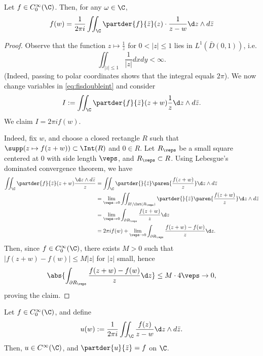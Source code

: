 \documentclass[11pt]{report}
\begin{document}
\begin{thm}[][label=thm:fisdoubleint]
    Let $f \in C_0^\infty (\C)$. Then, for any $\omega \in \C$,
    \begin{align} \label{eq:fisdoubleint}
        f(w) = \frac{1}{2\pi i }\iint_\C \partder{f}{\bar z}(z)\cdot  \frac{1}{z-w}\d z \land d \bar z
    \end{align}
\end{thm}

\begin{proof}
    Observe that the function $z \mapsto \frac{1}{z}$ for $0 < |z| \leq 1$ lies in $L^1(\bar D(0,1))$, i.e.
    $$\iint_{|z|\leq 1}\frac{1}{|z|}dxdy < \infty.$$
    (Indeed, passing to polar coordinates shows that the integral equals $2\pi$). We now change variables in \eqref{eq:fisdoubleint} and consider
    $$I:= \iint_\C \partder{f}{\bar z}(z+w)\frac{1}{z}\d z \land d \bar z.$$
    We claim $I = 2\pi i f(w)$.

    Indeed, fix $w$, and choose a closed rectangle $R$ such that $\supp(z \mapsto f(z+w)) \subset \Int (R)$ and $0 \in R$. Let $R_\veps$ be a small square centered at $0$ with side length $\veps$, and $R_\veps \subset R$. Using Lebesgue's dominated convergence theorem, we have
    \begin{align*}
        \iint_\C \partder{f}{\bar z}(z+w) \frac{\d z \land d \bar z}{z}&=\iint_\C \partder{}{\bar z} \paren{\frac{f(z+w)}{z}}\d z \land d \bar z
        \\ &= \lim_{\veps \to 0}\iint_{R \setminus \Int (R_\veps)}\partder{}{\bar z}\paren{\frac{f(z+w)}{z}}\d z \land d\bar z
        \\ &= \lim_{\veps \to 0}\int_{\partial R_\veps}\frac{f(z+w)}{z}\d z
        \\ &= 2\pi if(w) + \lim_{\veps \to 0}\int_{\partial R_\veps}\frac{f(z+w)-f(w)}{z}\d z.
    \end{align*}
    Then, since $f \in C_0^\infty (\C)$, there exists $M>0$ such that $|f(z+w)-f(w)| \leq M|z|$ for $|z|$ small, hence
    $$\abs{\int_{\partial R_\veps}\frac{f(z+w)-f(w)}{z}\d z}\leq M\cdot 4\veps \to 0,$$
    proving the claim.
\end{proof}

\begin{thm}[][label=thm:fispartder]
    Let $f \in C_0^\infty (\C)$, and define 
    $$u(w) := \frac{1}{2\pi i }\iint_\C \frac{f(z)}{z-w}\d z \land d \bar z.$$
    Then, $u \in C^\infty (\C)$, and $\partder{u}{\bar z}=f$ on $\C$.
\end{thm}
\end{document}
